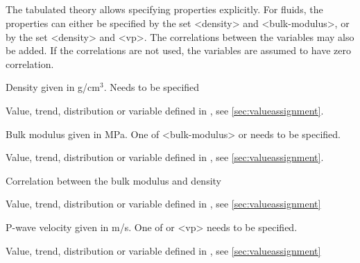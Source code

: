 {\subparagraph{}
 \slist
   \item \Description The tabulated theory allows specifying properties explicitly. For fluids, the properties can either be specified by the set <density> and <bulk-modulus>, or by the set <density> and <vp>. The correlations between the variables may also be added. If the correlations are not used, the variables are assumed to have zero correlation.
   \item \Argument
   \item \Default
 \elist

 \slist
   \item \Description Density given in g/cm$^3$. Needs to be specified
   \item \Argument Value, trend, distribution or variable defined in , see \autoref{sec:valueassignment}.
   \item \Default
 \elist

 \slist
   \item \Description Bulk modulus given in MPa. One of <bulk-modulus> or  needs to be specified.
   \item \Argument Value, trend, distribution or variable defined in , see \autoref{sec:valueassignment}.
   \item \Default
 \elist

 \slist
   \item \Description Correlation between the bulk modulus and density
   \item \Argument Value, trend, distribution or variable defined in , see \autoref{sec:valueassignment}
   \item {}
 \elist

 \slist
   \item \Description P-wave velocity given in m/s. One of  or <vp> needs to be specified.
   \item \Argument Value, trend, distribution or variable defined in , see \autoref{sec:valueassignment}
   \item \Default
 \elist

}
